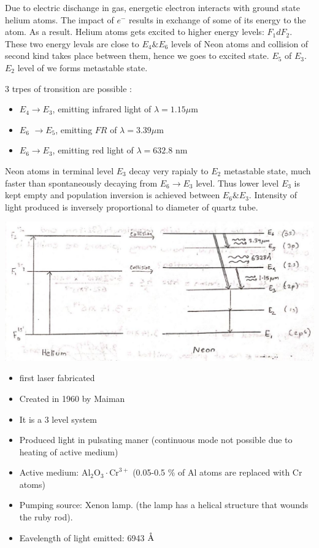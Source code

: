 \documentclass[12pt, a4paper]{article}
\begin{document}
Due to electric dischange in gas, energetic electron interacts with ground state helium atoms. The impact of $e^{-}$ results in exchange of some of its energy to the atom. As a result. Helium atoms gets excited to higher energy levels: $F_{1} d F_{2}$. These two energy levals are close to $E_{4} \& E_{6}$ levels of Neon atoms and collision of second kind takes place between them, hence we goes to excited state. $E_{5}$ of $E_{3}$. $E_2$ level of we forms metastable state.

3 trpes of tronsition are possible :

\begin{itemize}
	\item $E_{4} \rightarrow E_{3}$, emitting infrared light of $\lambda=1.15 \mu \mathrm{m}$
	\item $E_6$ $\rightarrow E_5$, emitting $F R$ of $\lambda = 3.39 \mu \mathrm{m}$
	\item $E_6 \rightarrow E_3$, emitting red light of $\lambda = 632.8$ nm
\end{itemize}

Neon atoms in terminal level $E_{3}$ decay very rapialy to $E_{2}$ metastable state, much faster than spontaneously decaying from $E_{6} \rightarrow E_{3}$ level. Thus lower level $E_3$ is kept empty and population inversion is achieved between $E_{6} \& E_{3}$. Intensity of light produced is inversely proportional to diameter of quartz tube.

\begin{center}
	\includegraphics[max width=\textwidth]{2024_06_16_30d750483617f1939202g-04}
\end{center}



\begin{itemize}
	\item first laser fabricated
	\item Created in 1960 by Maiman
	\item It is a 3 level system
	\item Produced light in pulsating maner (continuous mode not possible due to heating of active medium)
	\item Active medium: $\mathrm{Al}_{2} \mathrm{O}_{3} \cdot \mathrm{Cr}^{3+}$ (0.05-0.5 \% of Al atoms are replaced with Cr atoms)
	\item Pumping source: Xenon lamp. (the lamp has a helical structure that wounds the ruby rod).
	\item Eavelength of light emitted: 6943 $\mathring{\textrm{A}}$
\end{itemize}
\end{document}
